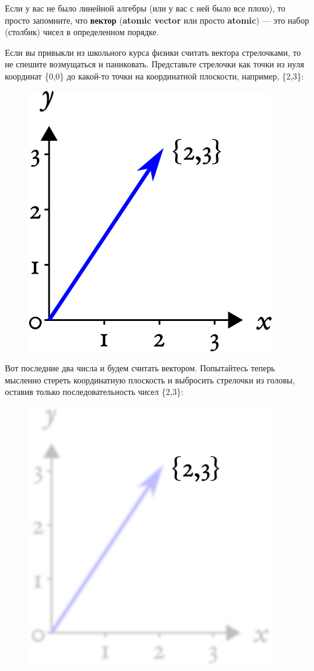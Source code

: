 \documentclass[]{book}
\begin{document}
Если у вас не было линейной алгебры (или у вас с ней было все плохо), то
просто запомните, что \textbf{вектор} (\textbf{atomic vector} или просто
\textbf{atomic}) --- это набор (столбик) чисел в определенном порядке.

Если вы привыкли из школьного курса физики считать вектора стрелочками,
то не спешите возмущаться и паниковать. Представьте стрелочки как точки
из нуля координат \{0,0\} до какой-то точки на координатной плоскости,
например, \{2,3\}:

\begin{figure}
\centering
\includegraphics[width=4.16667in]{images/coord_vector.png}
\caption{}
\end{figure}

Вот последние два числа и будем считать вектором. Попытайтесь теперь
мысленно стереть координатную плоскость и выбросить стрелочки из головы,
оставив только последовательность чисел \{2,3\}:

\begin{figure}
\centering
\includegraphics[width=4.16667in]{images/coord_vector_blur.png}
\caption{}
\end{figure}
\end{document}
